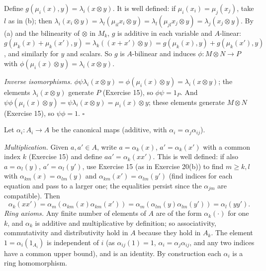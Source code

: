 \documentclass[11pt]{article}
\begin{document}
Define $g(\mu_i(x),y)=\lambda_i(x\otimes y)$. It is well defined: if $\mu_i(x_i)=\mu_j(x_j)$, take $l$ as in (b); then $\lambda_i(x_i\otimes y)=\lambda_l(\mu_{il}x_i\otimes y)=\lambda_l(\mu_{jl}x_j\otimes y)=\lambda_j(x_j\otimes y)$. By (a) and the bilinearity of $\otimes$ in $M_k$, $g$ is additive in each variable and $A$-linear: $g(\mu_k(x)+\mu_k(x'),y)=\lambda_k((x+x')\otimes y)=g(\mu_k(x),y)+g(\mu_k(x'),y)$, and similarly for $y$ and scalars. So $g$ is $A$-bilinear and induces $\phi:M\otimes N\to P$ with $\phi(\mu_i(x)\otimes y)=\lambda_i(x\otimes y)$.

\emph{Inverse isomorphisms.} $\phi\psi\lambda_i(x\otimes y)=\phi(\mu_i(x)\otimes y)=\lambda_i(x\otimes y)$; the elements $\lambda_i(x\otimes y)$ generate $P$ (Exercise 15), so $\phi\psi=1_P$. And $\psi\phi(\mu_i(x)\otimes y)=\psi\lambda_i(x\otimes y)=\mu_i(x)\otimes y$; these elements generate $M\otimes N$ (Exercise 15), so $\psi\phi=1$. \hfill$\square$

\pf
Let $\alpha_i:A_i\to A$ be the canonical maps (additive, with $\alpha_i=\alpha_j\alpha_{ij}$).

\emph{Multiplication.} Given $a,a'\in A$, write $a=\alpha_k(x)$, $a'=\alpha_k(x')$ with a common index $k$ (Exercise 15) and define $aa'=\alpha_k(xx')$. This is well defined: if also $a=\alpha_l(y)$, $a'=\alpha_l(y')$, use Exercise 15 (as in Exercise 20(b)) to find $m\ge k,l$ with $\alpha_{km}(x)=\alpha_{lm}(y)$ and $\alpha_{km}(x')=\alpha_{lm}(y')$ (find indices for each equation and pass to a larger one; the equalities persist since the $\alpha_{jm}$ are compatible). Then
\[
\alpha_k(xx')=\alpha_m(\alpha_{km}(x)\alpha_{km}(x'))=\alpha_m(\alpha_{lm}(y)\alpha_{lm}(y'))=\alpha_l(yy').
\]
\emph{Ring axioms.} Any finite number of elements of $A$ are of the form $\alpha_k(\cdot)$ for one $k$, and $\alpha_k$ is additive and multiplicative by definition; so associativity, commutativity and distributivity hold in $A$ because they hold in $A_k$. The element $1=\alpha_i(1_{A_i})$ is independent of $i$ (as $\alpha_{ij}(1)=1$, $\alpha_i=\alpha_j\alpha_{ij}$, and any two indices have a common upper bound), and is an identity. By construction each $\alpha_i$ is a ring homomorphism.
\end{document}
